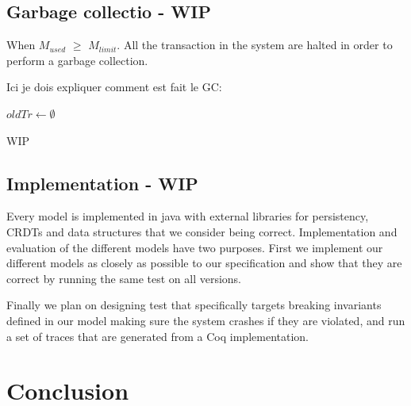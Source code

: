 \documentclass[systeme]{compas2022}
\begin{document}
\subsection{Garbage collectio - WIP}
When \emph{$M_{used}$} $\geq$ \emph{$M_{limit}$}. 
All the transaction in the system are halted in order to perform a garbage collection.

Ici je dois expliquer comment est fait le GC:\\
\begin{algorithm}
  \(oldTr \longleftarrow \emptyset\)\;
\end{algorithm}

WIP


\subsection{Implementation - WIP}

Every model is implemented in java with external libraries for persistency, CRDTs and data structures that we consider being correct.
Implementation and evaluation of the different models have two purposes.
First we implement our different models as closely as possible to our specification and show that they are correct by running the same test on all versions.

Finally we plan on designing test that specifically targets breaking invariants defined in our model making sure the system crashes if they are violated, and run a set of traces that are generated from a Coq implementation.



\section{Conclusion}



\end{document}
